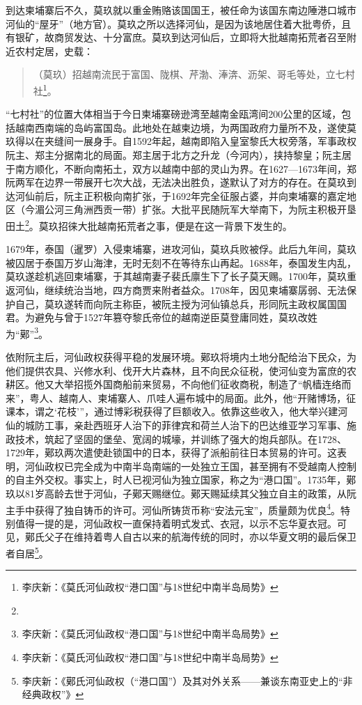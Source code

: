 到达柬埔寨后不久，莫玖就以重金贿赂该国国王，被任命为该国东南边陲港口城市河仙的“屋牙”（地方官）。莫玖之所以选择河仙，是因为该地居住着大批粤侨，且有银矿，故商贸发达、十分富庶。莫玖到达河仙后，立即将大批越南拓荒者召至附近农村定居，史载：

\begin{quote}

（莫玖）招越南流民于富国、陇棋、芹渤、淎渀、沥架、哥毛等处，立七村社\footnote{李庆新：《莫氏河仙政权“港口国”与18世纪中南半岛局势》}。

\end{quote}

“七村社”的位置大体相当于今日柬埔寨磅逊湾至越南金瓯湾间200公里的区域，包括越南西南端的岛屿富国岛。此地处在越柬边境，为两国政府力量所不及，遂使莫玖得以在夹缝间一展身手。自1592年起，越南即陷入皇室黎氏大权旁落，军事政权阮主、郑主分据南北的局面。郑主居于北方之升龙（今河内），挟持黎皇；阮主居于南方顺化，不断向南拓土，双方以越南中部的灵山为界。在1627—1673年间，郑阮两军在边界一带展开七次大战，无法决出胜负，遂默认了对方的存在。在莫玖到达河仙前后，阮主正积极向南扩张，于1692年完全征服占婆，并向柬埔寨的嘉定地区（今湄公河三角洲西贡一带）扩张。大批平民随阮军大举南下，为阮主积极开垦田土\footnote{}。莫玖招徕大批越南拓荒者之事，便是在这一背景下发生的。

1679年，泰国（暹罗）入侵柬埔寨，进攻河仙，莫玖兵败被俘。此后九年间，莫玖被囚居于泰国万岁山海津，无时无刻不在等待东山再起。1688年，泰国发生内乱，莫玖遂趁机逃回柬埔寨，于其越南妻子裴氏廪生下了长子莫天赐。1700年，莫玖重返河仙，继续统治当地，四方商贾来附者益众。1708年，因见柬埔寨孱弱、无法保护自己，莫玖遂转而向阮主称臣，被阮主授为河仙镇总兵，形同阮主政权属国国君。为避免与曾于1527年篡夺黎氏帝位的越南逆臣莫登庸同姓，莫玖改姓为“鄚”\footnote{李庆新：《莫氏河仙政权“港口国”与18世纪中南半岛局势》}。

依附阮主后，河仙政权获得平稳的发展环境。鄚玖将境内土地分配给治下民众，为他们提供农具、兴修水利、伐开大片森林，且不向民众征税，使河仙变为富庶的农耕区。他又大举招揽外国商船前来贸易，不向他们征收商税，制造了“帆樯连络而来”，粤人、越南人、柬埔寨人、爪哇人遍布城中的局面。此外，他“开赌博场，征课本，谓之‘花枝’”，通过博彩税获得了巨额收入。依靠这些收入，他大举兴建河仙的城防工事，亲赴西班牙人治下的菲律宾和荷兰人治下的巴达维亚学习军事、施政技术，筑起了坚固的堡垒、宽阔的城壕，并训练了强大的炮兵部队。在1728、1729年，鄚玖两次遣使赴锁国中的日本，获得了派船前往日本贸易的许可。这表明，河仙政权已完全成为中南半岛南端的一处独立王国，甚至拥有不受越南人控制的自主外交权。事实上，时人已视河仙为独立国家，称之为“港口国”。1735年，鄚玖以81岁高龄去世于河仙，子鄚天赐继位。鄚天赐延续其父独立自主的政策，从阮主手中获得了独自铸币的许可。河仙所铸货币称“安法元宝”，质量颇为优良\footnote{李庆新：《莫氏河仙政权“港口国”与18世纪中南半岛局势》}。特别值得一提的是，河仙政权一直保持着明式发式、衣冠，以示不忘华夏衣冠。可见，鄚氏父子在维持着粤人自古以来的航海传统的同时，亦以华夏文明的最后保卫者自居\footnote{李庆新：《鄚氏河仙政权（“港口国”）及其对外关系——兼谈东南亚史上的“非经典政权”》}。

